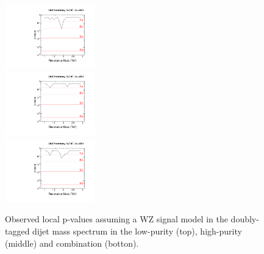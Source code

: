 \begin{figure}[h!tpb]
\begin{center}
\includegraphics[width=0.35\textwidth]{EXO-12-024/figs/limits/pvalue_WZ_low_purity.pdf}\\
\includegraphics[width=0.35\textwidth]{EXO-12-024/figs/limits/pvalue_WZ_high_purity.pdf}\\
\includegraphics[width=0.35\textwidth]{EXO-12-024/figs/limits/pvalue_WZ_combined.pdf}
\end{center}
\caption{Observed local p-values assuming a WZ signal model in the doubly-tagged dijet mass spectrum in the low-purity (top), high-purity (middle) and combination (botton).}
\label{fig:Vtagresults6}
\end{figure}

